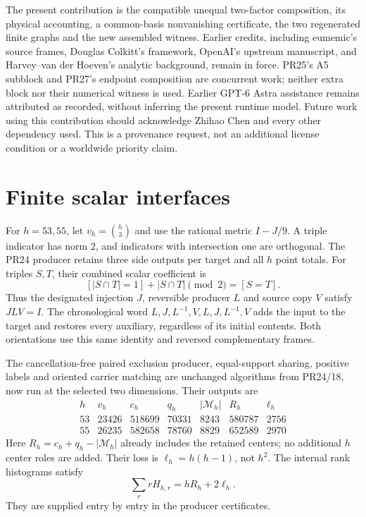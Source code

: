 \documentclass[11pt]{article}
\begin{document}
The present contribution is the compatible unequal two-factor composition,
its physical accounting, a common-basis nonvanishing certificate, the two
regenerated finite graphs and the new assembled witness. Earlier credits,
including eumemic's source frames, Douglas Colkitt's framework, OpenAI's
upstream manuscript, and Harvey--van der Hoeven's analytic background,
remain in force. PR25's A5 subblock and PR27's endpoint composition are
concurrent work; neither extra block nor their numerical witness is used.
Earlier GPT-6 Astra assistance remains attributed as recorded, without
inferring the present runtime model. Future work using this contribution
should acknowledge Zhihao Chen and every other dependency used. This is
a provenance request, not an additional license condition or a worldwide
priority claim.

\section{Finite scalar interfaces}
For $h=53,55$, let $v_h=\binom h3$ and use the rational metric $I-J/9$.
A triple indicator has norm $2$, and indicators with intersection one
are orthogonal. The PR24 producer retains three side outputs per target
and all $h$ point totals. For triples $S,T$, their combined scalar
coefficient is
\[
 [|S\cap T|=1]+|S\cap T|\pmod2=[S=T].
\]
Thus the designated injection $J$, reversible producer $L$ and source
copy $V$ satisfy $JLV=I$. The chronological word
$L,J,L^{-1},V,L,J,L^{-1},V$ adds the input to the target and restores
every auxiliary, regardless of its initial contents. Both orientations
use this same identity and reversed complementary frames.

The cancellation-free paired exclusion producer, equal-support sharing,
positive labels and oriented carrier matching are unchanged algorithms
from PR24/18, now run at the selected two dimensions. Their outputs are
\[
\begin{array}{c|rrrrrr}
h&v_h&c_h&q_h&|\mathcal M_h|&R_h&\ell_h\\\hline
53&23426&518699&70331&8243&580787&2756\\
55&26235&582658&78760&8829&652589&2970
\end{array}
\]
Here $R_h=c_h+q_h-|\mathcal M_h|$ already includes the retained centers;
no additional $h$ center roles are added. Their loss is
$\ell_h=h(h-1)$, not $h^2$. The internal rank histograms satisfy
\[
 \sum_r rH_{h,r}=hR_h+2\ell_h.
\]
They are supplied entry by entry in the producer certificates.
\end{document}
